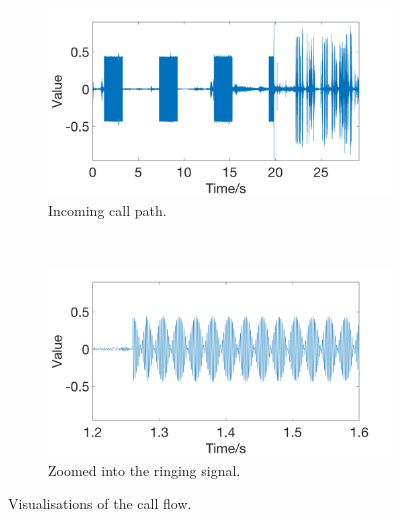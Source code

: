 \documentclass[main.tex]{subfiles}
\begin{document}
\begin{figure}[H]
	\captionsetup[subfigure]{position=b}
        \centering
        \begin{subfigure}{\textwidth}
                \includegraphics[width=\textwidth]{pics/wave1}
                \caption{Incoming call path.}
                \label{fig:wave1}
        \end{subfigure}
        \\
        \begin{subfigure}{\textwidth}
                \includegraphics[width=\textwidth]{pics/wave2}
                \caption{Zoomed into the ringing signal.}
                \label{fig:wave2}
        \end{subfigure}
	\caption{Visualisations of the call flow.}
	\label{fig:asterisk-callflow}
\end{figure}
\end{document}
